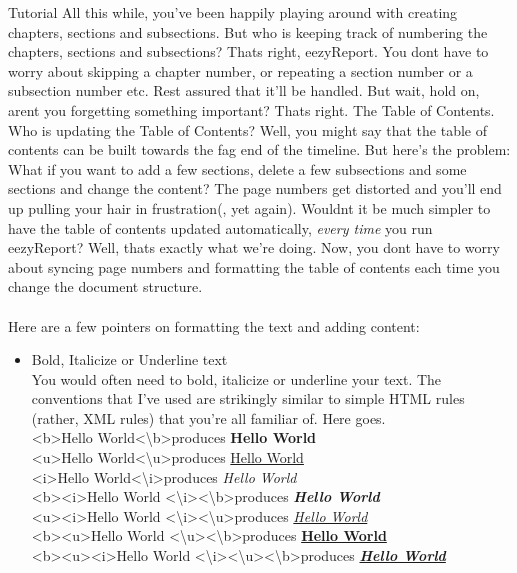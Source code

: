 \documentclass{report}
\begin{document}
\begin{projChapter}{Tutorial}
        All this while, you've been happily playing around with creating chapters, sections and subsections. But who is keeping track of numbering the chapters, sections and subsections? Thats right, eezyReport. You dont have to worry about skipping a chapter number, or repeating a section number or a subsection number etc. Rest assured that it'll be handled. But wait, hold on, arent you forgetting something important? Thats right. The Table of Contents. Who is updating the Table of Contents? Well, you might say that the table of contents can be built towards the fag end of the timeline. But here's the problem: What if you want to add a few sections, delete a few subsections and some sections and change the content? The page numbers get distorted and you'll end up pulling your hair in frustration(, yet again). Wouldnt it be much simpler to have the table of contents updated automatically, \textit{every time} you run eezyReport? Well, thats exactly what we're doing. Now, you dont have to worry about syncing page numbers and formatting the table of contents each time you change the document structure.
        ~\\\\
        Here are a few pointers on formatting the text and adding content:
        
\begin{itemize}
  \item Bold, Italicize or Underline text
                ~\\ You would often need to bold, italicize or underline your text. The conventions that I've used are strikingly similar to simple HTML rules (rather, XML rules) that you're all familiar of. Here goes.
                ~\\ \textless b\textgreater Hello World\textless \textbackslash b\textgreater  produces \textbf{Hello World}
                ~\\ \textless u\textgreater Hello World\textless \textbackslash u\textgreater  produces \underline{Hello World}
                ~\\ \textless i\textgreater Hello World\textless \textbackslash i\textgreater  produces \textit{Hello World}
                ~\\ \textless b\textgreater  \textless i\textgreater Hello World \textless \textbackslash i\textgreater \textless \textbackslash b\textgreater  produces \textbf{\textit{Hello World}}
                ~\\ \textless u\textgreater  \textless i\textgreater Hello World \textless \textbackslash i\textgreater \textless  \textbackslash u\textgreater  produces \underline{\textit{Hello World}}
                ~\\ \textless b\textgreater  \textless u\textgreater Hello World \textless \textbackslash u\textgreater \textless \textbackslash b\textgreater  produces \textbf{\underline{Hello World}}
                ~\\ \textless b\textgreater  \textless u\textgreater  \textless i\textgreater Hello World \textless \textbackslash i\textgreater \textless \textbackslash u\textgreater \textless \textbackslash b\textgreater  produces \textbf{\underline{\textit{Hello World}}}


\end{itemize}
\end{projChapter}
\end{document}
